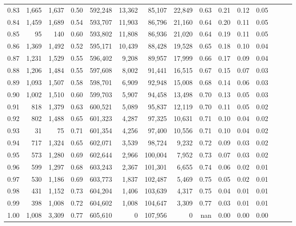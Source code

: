 \begin{tabular}{rrrrrrrrrrrrrrr}
0.83 &   1,665 &  1,637 &  0.50 &  592,248 &   13,362 &   85,107 &   22,849 &  0.63 &  0.21 &  0.12 &      0.05 \\
0.84 &   1,459 &  1,689 &  0.54 &  593,707 &   11,903 &   86,796 &   21,160 &  0.64 &  0.20 &  0.11 &      0.05 \\
0.85 &      95 &    140 &  0.60 &  593,802 &   11,808 &   86,936 &   21,020 &  0.64 &  0.19 &  0.11 &      0.05 \\
0.86 &   1,369 &  1,492 &  0.52 &  595,171 &   10,439 &   88,428 &   19,528 &  0.65 &  0.18 &  0.10 &      0.04 \\
0.87 &   1,231 &  1,529 &  0.55 &  596,402 &    9,208 &   89,957 &   17,999 &  0.66 &  0.17 &  0.09 &      0.04 \\
0.88 &   1,206 &  1,484 &  0.55 &  597,608 &    8,002 &   91,441 &   16,515 &  0.67 &  0.15 &  0.07 &      0.03 \\
0.89 &   1,093 &  1,507 &  0.58 &  598,701 &    6,909 &   92,948 &   15,008 &  0.68 &  0.14 &  0.06 &      0.03 \\
0.90 &   1,002 &  1,510 &  0.60 &  599,703 &    5,907 &   94,458 &   13,498 &  0.70 &  0.13 &  0.05 &      0.03 \\
0.91 &     818 &  1,379 &  0.63 &  600,521 &    5,089 &   95,837 &   12,119 &  0.70 &  0.11 &  0.05 &      0.02 \\
0.92 &     802 &  1,488 &  0.65 &  601,323 &    4,287 &   97,325 &   10,631 &  0.71 &  0.10 &  0.04 &      0.02 \\
0.93 &      31 &     75 &  0.71 &  601,354 &    4,256 &   97,400 &   10,556 &  0.71 &  0.10 &  0.04 &      0.02 \\
0.94 &     717 &  1,324 &  0.65 &  602,071 &    3,539 &   98,724 &    9,232 &  0.72 &  0.09 &  0.03 &      0.02 \\
0.95 &     573 &  1,280 &  0.69 &  602,644 &    2,966 &  100,004 &    7,952 &  0.73 &  0.07 &  0.03 &      0.02 \\
0.96 &     599 &  1,297 &  0.68 &  603,243 &    2,367 &  101,301 &    6,655 &  0.74 &  0.06 &  0.02 &      0.01 \\
0.97 &     530 &  1,186 &  0.69 &  603,773 &    1,837 &  102,487 &    5,469 &  0.75 &  0.05 &  0.02 &      0.01 \\
0.98 &     431 &  1,152 &  0.73 &  604,204 &    1,406 &  103,639 &    4,317 &  0.75 &  0.04 &  0.01 &      0.01 \\
0.99 &     398 &  1,008 &  0.72 &  604,602 &    1,008 &  104,647 &    3,309 &  0.77 &  0.03 &  0.01 &      0.01 \\
1.00 &   1,008 &  3,309 &  0.77 &  605,610 &        0 &  107,956 &        0 &   nan &  0.00 &  0.00 &      0.00 \\
\bottomrule
\end{tabular}
